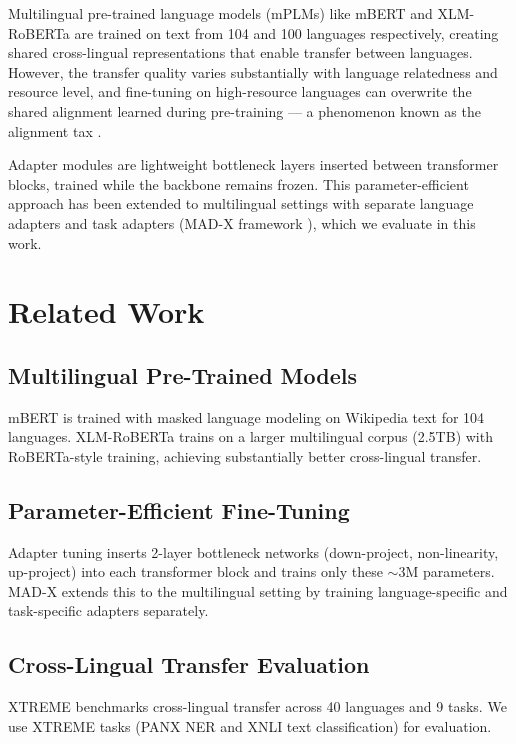 \documentclass[conference]{IEEEtran}
\begin{document}
Multilingual pre-trained language models (mPLMs) like mBERT \cite{devlin2018bert} and XLM-RoBERTa \cite{conneau2020unsupervised} are trained on text from 104 and 100 languages respectively, creating shared cross-lingual representations that enable transfer between languages. However, the transfer quality varies substantially with language relatedness and resource level, and fine-tuning on high-resource languages can overwrite the shared alignment learned during pre-training — a phenomenon known as the alignment tax \cite{wang2020negative}.

Adapter modules \cite{houlsby2019parameter} are lightweight bottleneck layers inserted between transformer blocks, trained while the backbone remains frozen. This parameter-efficient approach has been extended to multilingual settings with separate language adapters and task adapters (MAD-X framework \cite{pfeiffer2020mad}), which we evaluate in this work.

\section{Related Work}

\subsection{Multilingual Pre-Trained Models}
mBERT \cite{devlin2018bert} is trained with masked language modeling on Wikipedia text for 104 languages. XLM-RoBERTa \cite{conneau2020unsupervised} trains on a larger multilingual corpus (2.5TB) with RoBERTa-style training, achieving substantially better cross-lingual transfer.

\subsection{Parameter-Efficient Fine-Tuning}
Adapter tuning \cite{houlsby2019parameter} inserts 2-layer bottleneck networks (down-project, non-linearity, up-project) into each transformer block and trains only these $\sim$3M parameters. MAD-X \cite{pfeiffer2020mad} extends this to the multilingual setting by training language-specific and task-specific adapters separately.

\subsection{Cross-Lingual Transfer Evaluation}
XTREME \cite{hu2020xtreme} benchmarks cross-lingual transfer across 40 languages and 9 tasks. We use XTREME tasks (PANX NER and XNLI text classification) for evaluation.
\end{document}
